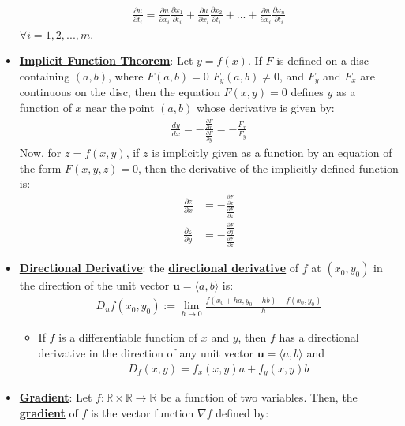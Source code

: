 \documentclass[11pt]{article}
\newcommand{\dfn}[1]{\underline{\textbf{#1}}}
\newcommand{\R}[0]{\mathbb{R}}
\begin{document}
\begin{itemize}[noitemsep]
	\begin{align}
		\frac{\partial u}{\partial t_i} = \frac{\partial u}{\partial x_i} \frac{\partial x_1}{\partial t_i}	+ \frac{\partial u}{\partial x_i} \frac{\partial x_2}{\partial t_i} + ... + \frac{\partial u}{\partial x_i} \frac{\partial x_n}{\partial t_i}
	\end{align}
	$\forall i = 1, 2, ..., m$. 
	\item \dfn{Implicit Function Theorem}: Let $y=f(x)$. If $F$ is defined on a disc containing $(a,b)$, where $F(a,b) = 0$ $F_y(a,b) \neq 0$, and $F_y$ and $F_x$ are continuous on the disc, then the equation $F(x,y) = 0$ defines $y$ as a function of $x$ near the point $(a,b)$ whose derivative is given by: 
	\begin{align}
		\frac{dy}{dx} = - \frac{\frac{\partial F}{\partial x}}{\frac{\partial F}{\partial y}} = - \frac{F_x}{F_y}	
	\end{align}
	Now, for $z=f(x,y)$, if $z$ is implicitly given as a function by an equation of the form $F(x,y,z) =0$, then the derivative of the implicitly defined function is: 
	\begin{align}
		\frac{\partial z}{\partial x} & = - \frac{\frac{\partial F}{\partial x}}{\frac{\partial F}{\partial z}}	\\
		\frac{\partial z}{\partial y} & = - \frac{\frac{\partial F}{\partial y}}{\frac{\partial F}{\partial z}}
	\end{align}
	\item \dfn{Directional Derivative}: the \dfn{directional derivative} of $f$ at $(x_0, y_0)$ in the direction of the unit vector $\mathbf{u} = \langle a, b \rangle$ is:
	\begin{align}
		D_uf(x_0, y_0) := \lim_{h \rightarrow 0 } \frac{f(x_0 + ha, y_0 + hb) - f(x_0, y_0)}{h}	
	\end{align}
	\begin{itemize}[noitemsep]
		\item If $f$ is a differentiable function of $x$ and $y$, then $f$ has a directional derivative in the direction of any unit vector $\mathbf{u} = \langle a, b \rangle$ and 
		\begin{align}	
			D_f(x,y) = f_x(x,y) a + f_y(x,y) b 	
		\end{align}
	\end{itemize}
	\item \dfn{Gradient}: Let $f: \R \times \R \rightarrow \R$ be a function of two variables. Then, the \dfn{gradient} of $f$ is the vector function $\nabla f$ defined by: 
	\begin{align*}

\end{align*}
\end{itemize}
\end{document}
